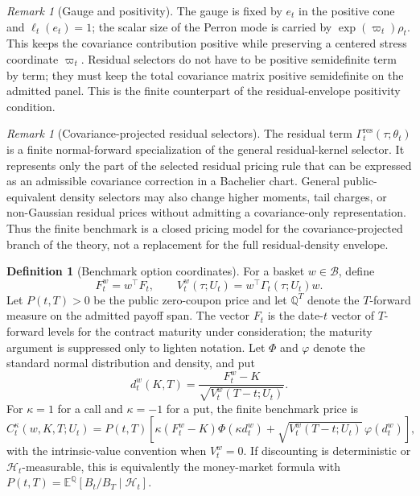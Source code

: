 \documentclass[11pt,a4paper]{amsart}
\theoremstyle{plain}
\theoremstyle{definition}
\newtheorem{definition}[theorem]{Definition}
\theoremstyle{remark}
\newtheorem{remark}[theorem]{Remark}
\newcommand{\QQ}{\mathbb{Q}}
\newcommand{\EE}{\mathbb{E}}
\newcommand{\cH}{\mathcal{H}}
\begin{document}
\begin{remark}[Gauge and positivity]\label{rem:finite-benchmark-gauge}
The gauge is fixed by \(e_t\) in the positive cone and \(\ell_t(e_t)=1\); the scalar size of the
Perron mode is carried by \(\exp(\varpi_t)\rho_t\).  This keeps the covariance contribution
positive while preserving a centered stress coordinate \(\varpi_t\).  Residual selectors do not have
to be positive semidefinite term by term; they must keep the total covariance matrix positive
semidefinite on the admitted panel.  This is the finite counterpart of the residual-envelope
positivity condition.
\end{remark}

\begin{remark}[Covariance-projected residual selectors]\label{rem:covariance-projected-selector}
The residual term \(\Gamma_t^{\mathrm{res}}(\tau;\theta_t)\) is a finite normal-forward
specialization of the general residual-kernel selector.  It represents only the part of the
selected residual pricing rule that can be expressed as an admissible covariance correction in a
Bachelier chart.  General public-equivalent density selectors may also change higher moments,
tail charges, or non-Gaussian residual prices without admitting a covariance-only
representation.  Thus the finite benchmark is a closed pricing model for the covariance-projected
branch of the theory, not a replacement for the full residual-density envelope.
\end{remark}

\begin{definition}[Benchmark option coordinates]\label{def:benchmark-option-coordinates}
For a basket \(w\in\mathcal B\), define
\[
        F_t^w=w^\top F_t,
        \qquad
        V_t^w(\tau;U_t)=w^\top\Gamma_t(\tau;U_t)w .
\]
Let \(P(t,T)>0\) be the public zero-coupon price and let \(\QQ^T\) denote the \(T\)-forward
measure on the admitted payoff span.  The vector \(F_t\) is the date-\(t\) vector of
\(T\)-forward levels for the contract maturity under consideration; the maturity argument is
suppressed only to lighten notation.  Let \(\Phi\) and \(\varphi\) denote the standard normal
distribution and density, and put
\[
        d_t^w(K,T)
        =
        \frac{F_t^w-K}{\sqrt{V_t^w(T-t;U_t)}} .
\]
For \(\kappa=1\) for a call and \(\kappa=-1\) for a put, the finite benchmark price is
\[
        C_t^\kappa(w,K,T;U_t)
        =
        P(t,T)
        \left[
        \kappa(F_t^w-K)\Phi(\kappa d_t^w)
        +
        \sqrt{V_t^w(T-t;U_t)}\,\varphi(d_t^w)
        \right],
\]
with the intrinsic-value convention when \(V_t^w=0\).  If discounting is deterministic or
\(\cH_t\)-measurable, this is equivalently the money-market formula with
\(P(t,T)=\EE^\QQ[B_t/B_T\mid\cH_t]\).
\end{definition}
\end{document}
